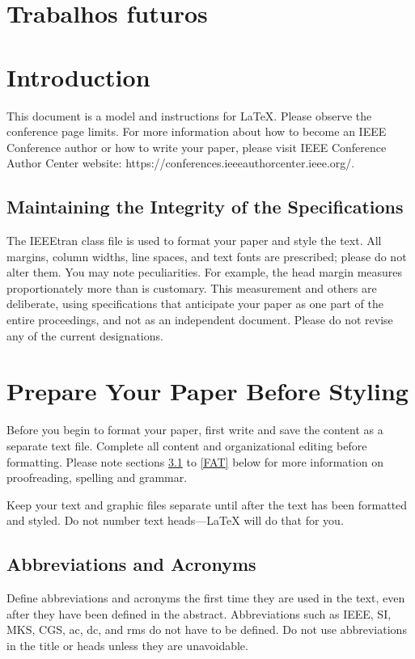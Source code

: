 \documentclass[conference]{IEEEtran}
\begin{document}
\section{Trabalhos futuros}


\newpage

\section{Introduction}
This document is a model and instructions for \LaTeX.
Please observe the conference page limits. For more information about how to become an IEEE Conference author or how to write your paper, please visit   IEEE Conference Author Center website: https://conferences.ieeeauthorcenter.ieee.org/.

\subsection{Maintaining the Integrity of the Specifications}

The IEEEtran class file is used to format your paper and style the text. All margins, 
column widths, line spaces, and text fonts are prescribed; please do not 
alter them. You may note peculiarities. For example, the head margin
measures proportionately more than is customary. This measurement 
and others are deliberate, using specifications that anticipate your paper 
as one part of the entire proceedings, and not as an independent document. 
Please do not revise any of the current designations.

\section{Prepare Your Paper Before Styling}
Before you begin to format your paper, first write and save the content as a 
separate text file. Complete all content and organizational editing before 
formatting. Please note sections \ref{AA} to \ref{FAT} below for more information on 
proofreading, spelling and grammar.

Keep your text and graphic files separate until after the text has been 
formatted and styled. Do not number text heads---{\LaTeX} will do that 
for you.

\subsection{Abbreviations and Acronyms}\label{AA}
Define abbreviations and acronyms the first time they are used in the text, 
even after they have been defined in the abstract. Abbreviations such as 
IEEE, SI, MKS, CGS, ac, dc, and rms do not have to be defined. Do not use 
abbreviations in the title or heads unless they are unavoidable.
\end{document}
